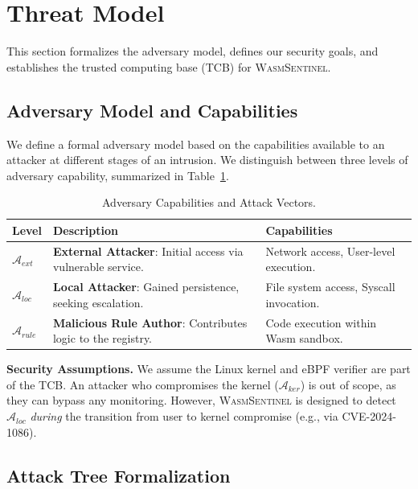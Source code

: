 
\section{Threat Model}
\label{sec:threat-model}

This section formalizes the adversary model, defines our security goals, and establishes the trusted computing base (TCB) for \textsc{WasmSentinel}.

\subsection{Adversary Model and Capabilities}

We define a formal adversary model based on the capabilities available to an attacker at different stages of an intrusion. We distinguish between three levels of adversary capability, summarized in Table~\ref{tab:adversary-capabilities}.

\begin{table}[h]
\centering
\caption{Adversary Capabilities and Attack Vectors.}
\label{tab:adversary-capabilities}
\begin{tabular}{lp{5cm}l}
\toprule
\textbf{Level} & \textbf{Description} & \textbf{Capabilities} \\
\midrule
$\mathcal{A}_{ext}$ & \textbf{External Attacker}: Initial access via vulnerable service. & Network access, User-level execution. \\
$\mathcal{A}_{loc}$ & \textbf{Local Attacker}: Gained persistence, seeking escalation. & File system access, Syscall invocation. \\
$\mathcal{A}_{rule}$ & \textbf{Malicious Rule Author}: Contributes logic to the registry. & Code execution within Wasm sandbox. \\
\bottomrule
\end{tabular}
\end{table}

\textbf{Security Assumptions.}
We assume the Linux kernel and eBPF verifier are part of the TCB. An attacker who compromises the kernel ($\mathcal{A}_{ker}$) is out of scope, as they can bypass any monitoring. However, \textsc{WasmSentinel} is designed to detect $\mathcal{A}_{loc}$ \textit{during} the transition from user to kernel compromise (e.g., via CVE-2024-1086).

\subsection{Attack Tree Formalization}

